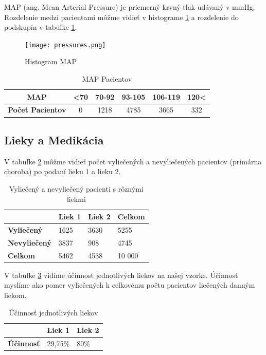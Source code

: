 MAP (ang. Mean Arterial Pressure) je priemerný krvný tlak udávaný v mmHg. Rozdelenie medzi pacientami môžme vidieť v histograme \ref{fig:histMAP} a rozdelenie do podskupín v tabuľke \ref{tab:map}.

\begin{figure}[h!]
	\centering
  		\texttt{[image: pressures.png]}
  	\caption{Histogram MAP}
  	\label{fig:histMAP}
\end{figure}


\begin{table}[h!]
\centering
\begin{tabular}{c|ccccc}
\hline
\textbf{MAP} & \textless70 & 70-92 & 93-105 & 106-119 & 120\textless \\ \hline
\textbf{Počet Pacientov} & 0 & 1218  & 4785   & 3665 & 332 \\ \hline
\end{tabular}
\caption{MAP Pacientov}
\label{tab:map}
\end{table}


\subsection{Lieky a Medikácia}

V tabuľke \ref{tab:sick-healthy} môžme vidieť počet vyliečených a nevyliečených pacientov (primárna choroba) po podaní lieku 1 a lieku 2. 

\begin{table}[h!]
\centering
\begin{tabular}{l|lll}
\hline
                     & \textbf{Liek 1} & \textbf{Liek 2} & \textbf{Celkom} \\ \hline
\textbf{Vyliečený}   & 1625            & 3630            & 5255            \\ \hline
\textbf{Nevyliečený} & 3837            & 908             & 4745            \\ \hline
\textbf{Celkom}      & 5462            & 4538            & 10 000          \\ \hline
\end{tabular}
\caption{Vyliečený a nevyliečený pacienti s rôznými liekmi}
\label{tab:sick-healthy}
\end{table}

V tabuľke \ref{tab:ucinnost} vidíme účinnosť jednotlivých liekov na našej vzorke. Účinnosť myslíme ako pomer vyliečených k celkovému počtu pacientov liečených danným liekom.

\begin{table}[h!]
\centering
\begin{tabular}{l|ll}
\hline
                  & \textbf{Liek 1} & \textbf{Liek 2} \\ \hline
\textbf{Účinnosť} & 29,75\%         & 80\%            \\ \hline
\end{tabular}
\caption{Účinnosť jednotlivých liekov}
\label{tab:ucinnost}
\end{table}

